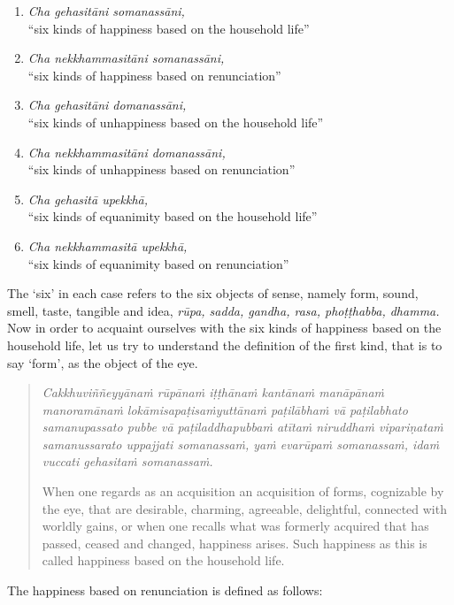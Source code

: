 \begin{enumerate}
\def\labelenumi{\arabic{enumi}.}
\tightlist
\item
  \emph{Cha gehasitāni somanassāni,}\\
  ``six kinds of happiness based on the household life''
\item
  \emph{Cha nekkhammasitāni somanassāni,}\\
  ``six kinds of happiness based on renunciation''
\item
  \emph{Cha gehasitāni domanassāni,}\\
  ``six kinds of unhappiness based on the household life''
\item
  \emph{Cha nekkhammasitāni domanassāni,}\\
  ``six kinds of unhappiness based on renunciation''
\item
  \emph{Cha gehasitā upekkhā,}\\
  ``six kinds of equanimity based on the household life''
\item
  \emph{Cha nekkhammasitā upekkhā,}\\
  ``six kinds of equanimity based on renunciation''
\end{enumerate}

The `six' in each case refers to the six objects of sense, namely form, sound, smell, taste, tangible and idea, \emph{rūpa, sadda, gandha, rasa, phoṭṭhabba, dhamma.} Now in order to acquaint ourselves with the six kinds of happiness based on the household life, let us try to understand the definition of the first kind, that is to say `form', as the object of the eye.

\begin{quote}
\emph{Cakkhuviññeyyānaṁ rūpānaṁ iṭṭhānaṁ kantānaṁ manāpānaṁ manoramānaṁ lokāmisapaṭisaṁyuttānaṁ paṭilābhaṁ vā paṭilabhato samanupassato pubbe vā paṭiladdhapubbaṁ atītaṁ niruddhaṁ vipariṇataṁ samanussarato uppajjati somanassaṁ, yaṁ evarūpaṁ somanassaṁ, idaṁ vuccati gehasitaṁ somanassaṁ.}

When one regards as an acquisition an acquisition of forms, cognizable by the eye, that are desirable, charming, agreeable, delightful, connected with worldly gains, or when one recalls what was formerly acquired that has passed, ceased and changed, happiness arises. Such happiness as this is called happiness based on the household life.
\end{quote}

The happiness based on renunciation is defined as follows:

